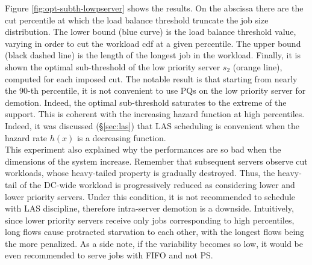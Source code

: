 Figure \ref{fig:opt-subth-lowpserver} shows the results. On the abscissa there are the cut percentile at which the load balance threshold truncate the job size distribution. The lower bound (blue curve) is the load balance threshold value, varying in order to cut the workload cdf at a given percentile.  The upper bound (black dashed line) is the length of the longest job in the workload. Finally, it is shown the optimal sub-threshold of the low priority server $s_2$ (orange line), computed for each imposed cut. The notable result is that starting from nearly the 90-th percentile, it is not convenient to use PQs on the low priority server for demotion. Indeed, the optimal sub-threshold saturates to the extreme of the support. This is coherent with the increasing hazard function at high percentiles. Indeed, it was discussed (\S \ref{sec:las}) that LAS scheduling is convenient when the hazard rate $h(x)$ is a decreasing function.\\
This experiment also explained why the performances are so bad when the dimensions of the system increase. Remember that subsequent servers observe cut workloads, whose heavy-tailed property is gradually destroyed. Thus, the heavy-tail of the DC-wide workload is progressively reduced as considering lower and lower priority servers. Under this condition, it is not recommended to schedule with LAS discipline, therefore intra-server demotion is a downside. Intuitively, since lower priority servers receive only jobs corresponding to high percentiles, long flows cause protracted starvation to each other, with the longest flows being the more penalized. As a side note, if the variability becomes so low, it would be even recommended to serve jobs with FIFO and not PS. 
